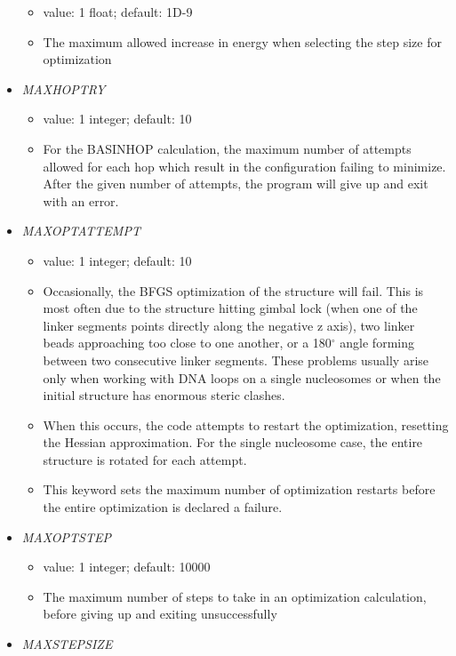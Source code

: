 \documentclass[12pt,dvips]{article}
\begin{document}
\begin{itemize}
\begin{itemize}
    \item value: 1 float; default: 1D-9
    \item The maximum allowed increase in energy when selecting the step size for optimization
  \end{itemize}
%
\item {\it MAXHOPTRY}
  \begin{itemize}
    \item value: 1 integer; default: 10
    \item For the BASINHOP calculation, the maximum number of attempts allowed for each hop which result in the configuration failing to minimize. After the given number of attempts, the program will give up and exit with an error.
  \end{itemize}
%
\item {\it MAXOPTATTEMPT}
  \begin{itemize}
    \item value: 1 integer; default: 10
    \item Occasionally, the BFGS optimization of the structure will
      fail. This is most often due to the structure hitting gimbal
      lock (when one of the linker segments points directly along the
      negative z axis), two linker beads approaching too close to one
      another, or a 180$^\circ$ angle forming between two consecutive
      linker segments. These problems usually arise only when working
      with DNA loops on a single nucleosomes or when the initial
      structure has enormous steric clashes. 
    \item When this occurs, the code attempts to restart the
      optimization, resetting the Hessian approximation. For the
      single nucleosome case, the entire structure is rotated for each
      attempt. 
    \item This keyword sets the maximum number of optimization
        restarts before the entire optimization is declared a failure.
  \end{itemize}
%
\item {\it MAXOPTSTEP}
  \begin{itemize}
    \item value: 1 integer; default: 10000
    \item The maximum number of steps to take in an optimization calculation, before giving up and exiting unsuccessfully
  \end{itemize}
%
\item {\it MAXSTEPSIZE}
  \begin{itemize}

\end{itemize}
\end{itemize}
\end{document}
